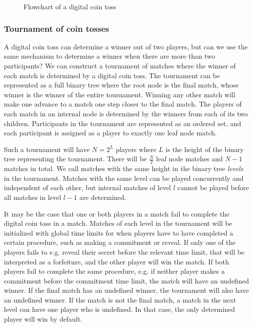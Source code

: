 \begin{figure}[htbp]
  \centering
  
  \caption{Flowchart of a digital coin toss}
\end{figure}

\subsubsection{Tournament of coin tosses}
A digital coin toss can determine a winner out of two players, but can we use the same mechanism to determine a winner when there are more than two participants? We can construct a tournament of matches where the winner of each match is determined by a digital coin toss. The tournament can be represented as a full binary tree where the root node is the final match, whose winner is the winner of the entire tournament. Winning any other match will make one advance to a match one step closer to the final match. The players of each match in an internal node is determined by the winners from each of its two children. Participants in the tournament are represented as an ordered set, and each participant is assigned as a player to exactly one leaf node match. 

Such a tournament will have $N=2^L$ players where $L$ is the height of the binary tree representing the tournament. There will be $\frac{N}{2}$ leaf node matches and $N-1$ matches in total. We call matches with the same height in the binary tree \emph{levels} in the tournament. Matches with the same level can be played concurrently and independent of each other, but internal matches of level $l$ cannot be played before all matches in level $l-1$ are determined.

It may be the case that one or both players in a match fail to complete the digital coin toss in a match. Matches of each level in the tournament will be initialized with global time limits for when players have to have completed a certain procedure, such as making a commitment or reveal. If only one of the players fails to e.g. reveal their secret before the relevant time limit, that will be interpreted as a forfeiture, and the other player will win the match. If both players fail to complete the same procedure, e.g. if neither player makes a commitment before the commitment time limit, the match will have an undefined winner. If the final match has an undefined winner, the tournament will also have an undefined winner. If the match is not the final match, a match in the next level can have one player who is undefined. In that case, the only determined player will win by default.

